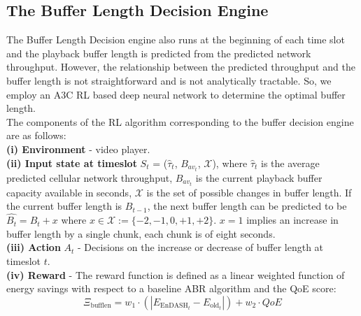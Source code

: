  \subsection{The Buffer Length Decision Engine}\label{sec:buff_length_dec_engine}
 \indent The Buffer Length Decision engine also runs at the beginning of each time slot and the playback buffer length is predicted from the predicted network throughput.  However, the relationship between the predicted throughput and the buffer length is not straightforward and is not analytically tractable. So, we employ an A3C \ac{RL} based deep neural network to determine the optimal buffer length.\\ 
\indent The components of the \ac{RL} algorithm corresponding to the buffer decision engine are as follows:\\
\noindent \textbf{(i) Environment}   - video player.\\
\noindent \textbf{(ii) Input state at timeslot } $S_t$ =  ($\hat{\tau}_{{t}}$, $B_{av_t}$, ${\mathcal{X}}$), where
  $\hat{\tau}_{{t}}$ is the  average predicted cellular network throughput,
 $B_{av_t}$ is the current playback buffer capacity available in seconds,
$\mathcal{X}$ is the set of possible changes in buffer length. If the current buffer length is $B_{t-1}$, the next buffer length can be predicted to be $\hat{B_t}= B_t+x$ where $x\in\mathcal{X}:=\{-2,-1,0,+1,+2\}$. $x=1$ implies an increase in buffer length by a single chunk, each chunk is of eight seconds.\\
\noindent \textbf{(iii) Action} $A_t$ - Decisions on the increase or decrease of buffer length at timeslot $t$. \\
\noindent \textbf{(iv) Reward} - The reward function is defined as a linear weighted function of energy savings with respect to a baseline ABR algorithm and the QoE score:
    \begin{equation}
    \Xi_{\mathrm{bufflen}} = w_1 \cdot (\left|E_{\mathrm{EnDASH}_t}-E_{\mathrm{old}_t}\right|)+w_2 \cdot QoE
    \end{equation}
    
